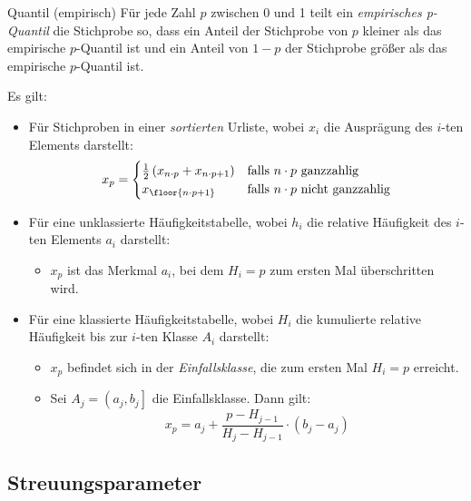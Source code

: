 \begin{defi}{Quantil (empirisch)}
    Für jede Zahl $p$ zwischen 0 und 1 teilt ein \emph{empirisches p-Quantil} die Stichprobe so, dass ein Anteil der Stichprobe von $p$ kleiner als das empirische $p$-Quantil ist und ein Anteil von $1-p$ der Stichprobe größer als das empirische $p$-Quantil ist.

    Es gilt:
    \begin{itemize}
        \item Für Stichproben in einer \emph{sortierten} Urliste, wobei $x_i$ die Ausprägung des $i$-ten Elements darstellt:
              \[
                  x_p =
                  \begin{cases}
                      \frac{1}{2} \left( x_{n \cdot p} + x_{n \cdot p + 1} \right) & \text{falls $n \cdot p$ ganzzahlig}       \\
                      x_{\floor{n \cdot p + 1}}                                    & \text{falls $n \cdot p$ nicht ganzzahlig} \\
                  \end{cases}
              \]
        \item Für eine unklassierte Häufigkeitstabelle, wobei $h_i$ die relative Häufigkeit des $i$-ten Elements $a_i$ darstellt:
              \begin{itemize}
                  \item $x_p$ ist das Merkmal $a_i$, bei dem $H_i = p$ zum ersten Mal überschritten wird.
              \end{itemize}
        \item Für eine klassierte Häufigkeitstabelle, wobei $H_i$ die kumulierte relative Häufigkeit bis zur $i$-ten Klasse $A_i$ darstellt:
              \begin{itemize}
                  \item $x_p$ befindet sich in der \emph{Einfallsklasse}, die zum ersten Mal $H_i = p$ erreicht.
                  \item Sei $A_j = \left( a_j, b_j \right]$ die Einfallsklasse.
                        Dann gilt:
                        \[
                            x_p = a_j + \frac{p - H_{j-1}}{H_{j} - H_{j-1}} \cdot (b_j - a_j)
                        \]
              \end{itemize}
    \end{itemize}
\end{defi}

\subsection{Streuungsparameter}

